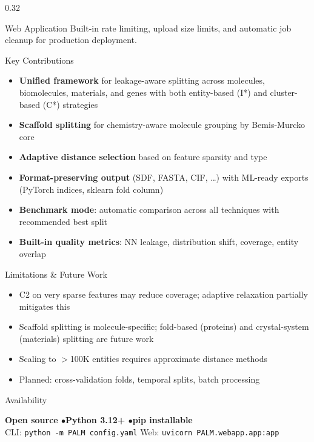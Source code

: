 \documentclass[final]{beamer}
\begin{document}
\begin{frame}[t]
\begin{columns}[T]
\begin{column}{0.32\textwidth}
\begin{block}{Web Application}
\vspace{0.3ex}
Built-in rate limiting, upload size limits, and automatic job cleanup for production deployment.
\end{block}

\begin{block}{Key Contributions}
\begin{itemize}
  \item \textbf{Unified framework} for leakage-aware splitting across molecules, biomolecules, materials, and genes with both entity-based (I*) and cluster-based (C*) strategies
  \item \textbf{Scaffold splitting} for chemistry-aware molecule grouping by Bemis-Murcko core
  \item \textbf{Adaptive distance selection} based on feature sparsity and type
  \item \textbf{Format-preserving output} (SDF, FASTA, CIF, \ldots) with ML-ready exports (PyTorch indices, sklearn fold column)
  \item \textbf{Benchmark mode}: automatic comparison across all techniques with recommended best split
  \item \textbf{Built-in quality metrics}: NN leakage, distribution shift, coverage, entity overlap
\end{itemize}
\end{block}

\begin{block}{Limitations \& Future Work}
\begin{itemize}
  \item C2 on very sparse features may reduce coverage; adaptive relaxation partially mitigates this
  \item Scaffold splitting is molecule-specific; fold-based (proteins) and crystal-system (materials) splitting are future work
  \item Scaling to $>$100K entities requires approximate distance methods
  \item Planned: cross-validation folds, temporal splits, batch processing
\end{itemize}
\end{block}

\begin{block}{Availability}
\begin{center}
{\Large\bfseries Open source \enspace$\bullet$\enspace Python 3.12+ \enspace$\bullet$\enspace pip installable}\\[0.5ex]
CLI: \texttt{python -m PALM config.yaml} \qquad Web: \texttt{uvicorn PALM.webapp.app:app}
\end{center}
\end{block}

\end{column}

\end{columns}

\end{frame}
\end{document}
